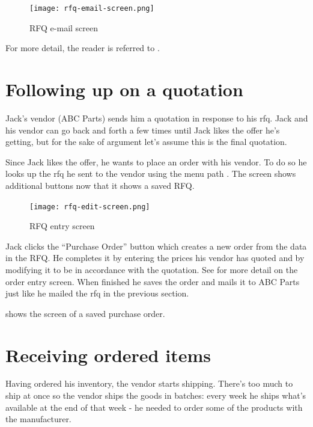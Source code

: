 \begin{figure}[h]
\centering
\texttt{[image: rfq-email-screen.png]}
\caption{RFQ e-mail screen}
\label{fig:rfq-email-screen}
\end{figure}

For more detail, the reader is referred to .


\section{Following up on a quotation}
\label{sec-stock-quotation-followup}

Jack's vendor (ABC Parts) sends him a quotation in response to his \gls{rfq}. Jack and his vendor
can go back and forth a few times until Jack likes the offer he's getting, but for the sake of
argument let's assume this is the final quotation.

Since Jack likes the offer, he wants to place an order with his vendor. To do so he looks up the
\gls{rfq} he sent to the vendor using the menu path .
The screen shows additional buttons now that it shows a saved RFQ.


\begin{figure}[h]
\centering
\texttt{[image: rfq-edit-screen.png]}
\caption{RFQ entry screen}
\label{fig:bus-rfq-edit-screen}
\end{figure}

Jack clicks the ``Purchase Order'' button which creates a new order from the data in the RFQ.
He completes it
by entering the prices his vendor has quoted and by modifying it to be in accordance with the
quotation. See  for more
detail on the order entry screen. When finished he saves the order and mails it to
ABC Parts just like he mailed the \gls{rfq} in the previous section.

 shows the screen of a saved purchase order.

\section{Receiving ordered items}
\label{sec-stock-receiving}

Having ordered his inventory, the vendor starts shipping. There's too much to ship at once
so the vendor ships the goods in batches: every week he ships what's available at the end
of that week - he needed to order some of the products with the manufacturer.

